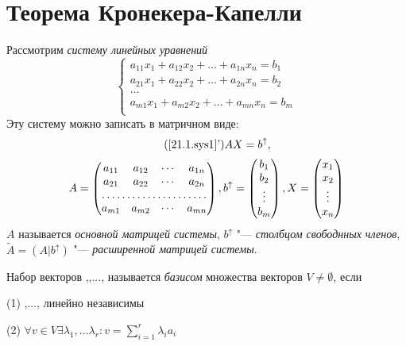 \section{Теорема Кронекера-Капелли}
  Рассмотрим \textit{систему линейных уравнений}
  \begin{equation}\label{21.1.sys1}
  \left\lbrace\begin{array}{crl}
  a_{11}x_1+a_{12}x_2+\ldots+a_{1n}x_n=b_1\\
  a_{21}x_1+a_{22}x_2+\ldots+a_{2n}x_n=b_2\\
  \ldots \\
  a_{m1}x_1+a_{m2}x_2+\ldots+a_{mn}x_n=b_m\\ 
  \end{array}\right.\end{equation}
  Эту систему можно записать в матричном виде:
  \begin{equation*}\tag{\ref{21.1.sys1}'}
  AX=b^{\uparrow},
  \end{equation*}
  \begin{equation*}
  A=\begin{pmatrix}
    a_{11} & a_{12} & \cdots & a_{1n} \\
    a_{21} & a_{22} & \cdots & a_{2n} \\
    \hdotsfor{4} \\
    a_{m1} & a_{m2} & \cdots & a_{mn} \\
    \end{pmatrix},
  b^\uparrow=\begin{pmatrix}
    b_1 \\ b_2 \\ \vdots \\ b_m \\
    \end{pmatrix},
  X=\begin{pmatrix}
    x_1 \\ x_2 \\ \vdots \\ x_n \\
    \end{pmatrix}
  \end{equation*}
  $A$ называется \textit{основной матрицей системы}, $b^\uparrow$ "--- \textit{столбцом свободнных членов}, $\widetilde A = (A|b^\uparrow)$ "--- \textit{расширенной матрицей системы}.
  \begin{defn}
  Набор векторов ,,..., называется \textit{базисом} множества векторов $V\neq \emptyset$, если
  
  (1) ,..., линейно независимы
  
  (2) $\forall v \in V \exists \lambda_1,...\lambda_r: v=\sum \limits_{i=1}^r\lambda_ia_i$
  \end{defn}
  
